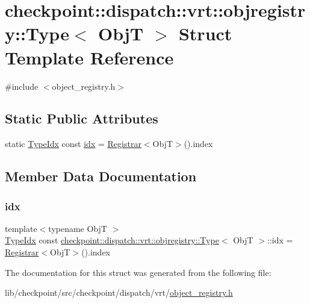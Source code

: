 \hypertarget{structcheckpoint_1_1dispatch_1_1vrt_1_1objregistry_1_1_type}{}\section{checkpoint\+:\+:dispatch\+:\+:vrt\+:\+:objregistry\+:\+:Type$<$ ObjT $>$ Struct Template Reference}
\label{structcheckpoint_1_1dispatch_1_1vrt_1_1objregistry_1_1_type}


{\ttfamily \#include $<$object\+\_\+registry.\+h$>$}

\subsection*{Static Public Attributes}
\begin{DoxyCompactItemize}
\item 
static \hyperlink{namespacecheckpoint_1_1dispatch_1_1vrt_acd3f9e6b091bcfbc23dc35ea8ef45d3b}{Type\+Idx} const \hyperlink{structcheckpoint_1_1dispatch_1_1vrt_1_1objregistry_1_1_type_abb875b1b8ad398dff7199ed4ff26d0f6}{idx} = \hyperlink{structcheckpoint_1_1dispatch_1_1vrt_1_1objregistry_1_1_registrar}{Registrar}$<$ObjT$>$().index
\end{DoxyCompactItemize}


\subsection{Member Data Documentation}
\mbox{\label{structcheckpoint_1_1dispatch_1_1vrt_1_1objregistry_1_1_type_abb875b1b8ad398dff7199ed4ff26d0f6}} 
\subsubsection{\texorpdfstring{idx}{idx}}
{\footnotesize\ttfamily template$<$typename ObjT $>$ \\
\hyperlink{namespacecheckpoint_1_1dispatch_1_1vrt_acd3f9e6b091bcfbc23dc35ea8ef45d3b}{Type\+Idx} const \hyperlink{structcheckpoint_1_1dispatch_1_1vrt_1_1objregistry_1_1_type}{checkpoint\+::dispatch\+::vrt\+::objregistry\+::\+Type}$<$ ObjT $>$\+::idx = \hyperlink{structcheckpoint_1_1dispatch_1_1vrt_1_1objregistry_1_1_registrar}{Registrar}$<$ObjT$>$().index\hspace{0.3cm}{\ttfamily [static]}}



The documentation for this struct was generated from the following file\+:\begin{DoxyCompactItemize}
\item 
lib/checkpoint/src/checkpoint/dispatch/vrt/\hyperlink{object__registry_8h}{object\+\_\+registry.\+h}\end{DoxyCompactItemize}
